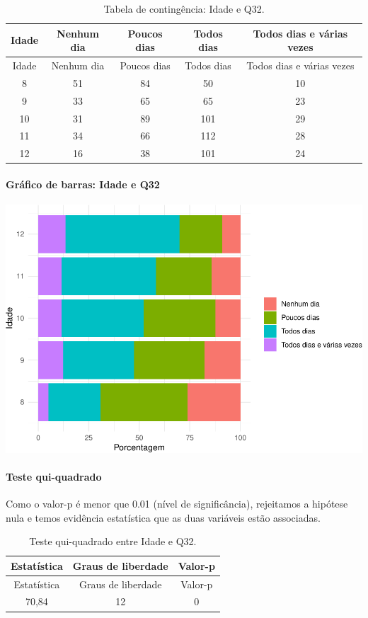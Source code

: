 \documentclass[]{article}
\let\oldparagraph\paragraph
\renewcommand{\paragraph}[1]{\oldparagraph{#1}\mbox{}}
\begin{document}
\begin{longtable}[]{@{}ccccc@{}}
\caption{\label{tab:unnamed-chunk-1094}Tabela de contingência: Idade e Q32.}\tabularnewline
\toprule
Idade & Nenhum dia & Poucos dias & Todos dias & Todos dias e várias vezes\tabularnewline
\midrule
\endfirsthead
\toprule
Idade & Nenhum dia & Poucos dias & Todos dias & Todos dias e várias vezes\tabularnewline
\midrule
\endhead
8 & 51 & 84 & 50 & 10\tabularnewline
9 & 33 & 65 & 65 & 23\tabularnewline
10 & 31 & 89 & 101 & 29\tabularnewline
11 & 34 & 66 & 112 & 28\tabularnewline
12 & 16 & 38 & 101 & 24\tabularnewline
\bottomrule
\end{longtable}

\hypertarget{gruxe1fico-de-barras-idade-e-q32}{%
\paragraph{Gráfico de barras: Idade e Q32}\label{gruxe1fico-de-barras-idade-e-q32}}

\begin{center}\includegraphics[width=0.75\linewidth]{relatorio_covid19_files/figure-latex/unnamed-chunk-1095-1} \end{center}

\hypertarget{teste-qui-quadrado-94}{%
\paragraph{Teste qui-quadrado}\label{teste-qui-quadrado-94}}

Como o valor-p é menor que 0.01 (nível de significância), rejeitamos a hipótese nula e temos evidência estatística que as duas variáveis estão associadas.

\begin{longtable}[]{@{}ccc@{}}
\caption{\label{tab:unnamed-chunk-1097}Teste qui-quadrado entre Idade e Q32.}\tabularnewline
\toprule
Estatística & Graus de liberdade & Valor-p\tabularnewline
\midrule
\endfirsthead
\toprule
Estatística & Graus de liberdade & Valor-p\tabularnewline
\midrule
\endhead
70,84 & 12 & 0\tabularnewline
\bottomrule
\end{longtable}
\end{document}
